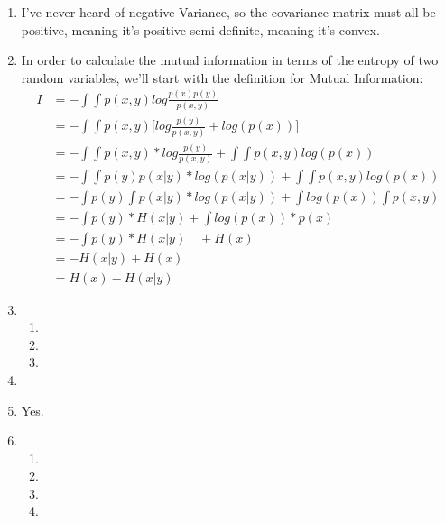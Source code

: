 \documentclass[11pt,a4paper]{article}
\begin{document}
\begin{enumerate}
			\item I've never heard of negative Variance, so the covariance matrix must all be positive, meaning it's positive semi-definite, meaning it's convex.
			\item In order to calculate the mutual information in terms of the entropy of two random variables, we'll start with the definition for Mutual Information:
			\begin{align*}
				I &= -\int \int p(x,y) log \frac{p(x)p(y)}{p(x,y)} \\
				&= -\int \int p(x,y) \Big[ log \frac{p(y)}{p(x,y)} + log(p(x)) \Big] \\
				&= -\int \int p(x,y) * log \frac{p(y)}{p(x,y)} + \int \int p(x,y) log(p(x)) \\
				&= -\int \int p(y) p(x|y) * log (p(x|y)) + \int \int p(x,y) log(p(x)) \\
				&= -\int p(y) \int p(x|y) * log (p(x|y)) + \int log(p(x)) \int p(x,y)  \\
				&= -\int p(y) * H(x|y) + \int log(p(x)) * p(x)  \\
				&= -\int p(y) * H(x|y) \quad  + H(x)  \\
				&= -H(x|y) + H(x)  \\
				&= H(x) - H(x|y)
			\end{align*}
			\item 
			\begin{enumerate}
				\item
				\item
				\item
			\end{enumerate}
			\item
			\item Yes.
			\item 
			\begin{enumerate}
				\item 
				\item
				\item
				\item
			\end{enumerate}
					
		\end{enumerate}
\end{document}
